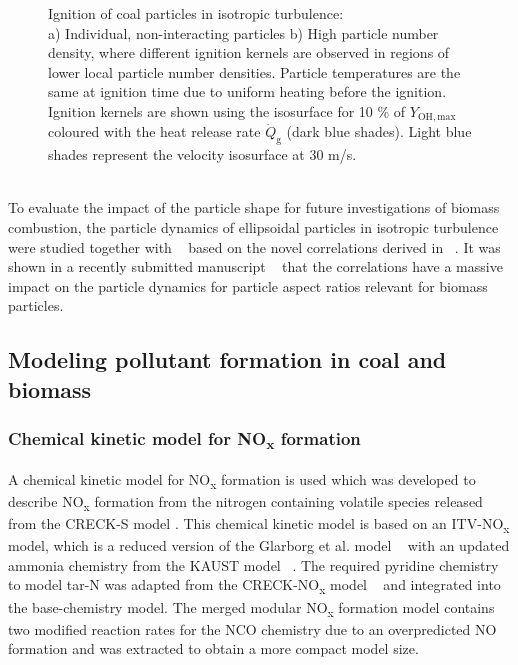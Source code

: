 \begin{btUnit}
\begin{figure}
	\caption{Ignition of coal particles in isotropic turbulence:\\a) Individual, non-interacting particles b) High particle number density, where different ignition kernels are observed in regions of lower local particle number densities. Particle temperatures are the same at ignition time due to uniform heating before the ignition. Ignition kernels are shown using the isosurface for 10 \% of $Y_\mathrm{OH,max}$ coloured with the heat release rate $\dot{Q}_\mathrm{g}$ (dark blue shades). Light blue shades represent the velocity isosurface at 30 m/s.}\label{fig:B3TurbulenceBox}
\end{figure}
\\
To evaluate the impact of the particle shape for future investigations of biomass combustion, the particle dynamics of ellipsoidal particles in isotropic turbulence were studied together with ~ based on the novel correlations derived in ~\cite{Frhlich2020}. It was shown in a recently submitted manuscript ~\cite{Frhlich2021} that the correlations have a massive impact on the particle dynamics for particle aspect ratios relevant for biomass particles.


\subsection{Modeling pollutant formation in coal and biomass} 

\subsubsection{Chemical kinetic model for NO\textsubscript{x} formation}
A chemical kinetic model for NO\textsubscript{x} formation is used which was developed to describe NO\textsubscript{x} formation from the nitrogen containing volatile species released from the CRECK-S model \cite{Ranzi2008, Debiagi2015}. This chemical kinetic model is based on an ITV-NO\textsubscript{x} model, which is a reduced version of the Glarborg et al. model ~\cite{Glarborg2018} with an updated ammonia chemistry from the KAUST model ~\cite{Zhang2021}. The required pyridine chemistry to model tar-N was adapted from the CRECK-NO\textsubscript{x} model ~\cite{Shamooni2021} and integrated into the base-chemistry model. The merged modular NO\textsubscript{x} formation model contains two modified reaction rates for the NCO chemistry due to an overpredicted NO formation and was extracted to obtain a more compact model size. 


\end{btUnit}
